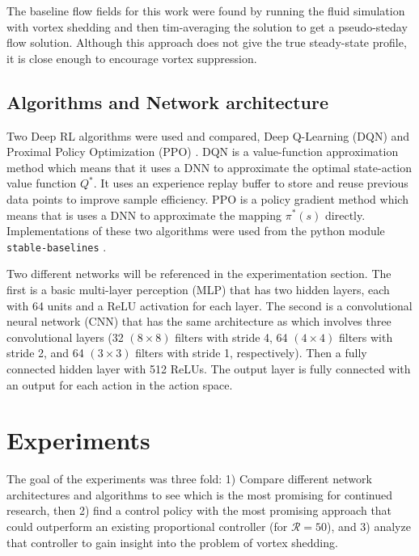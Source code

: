 \documentclass{article}
\begin{document}
The baseline flow fields for this work were found by running the fluid simulation with vortex shedding and then tim-averaging the solution to get a pseudo-steday flow solution. Although this approach does not give the true steady-state profile, it is close enough to encourage vortex suppression.

\subsection{Algorithms and Network architecture}

Two Deep RL algorithms were used and compared, Deep Q-Learning (DQN) \cite{mnih2013playing} and Proximal Policy Optimization (PPO) \cite{schulman2017proximal}.  DQN is a value-function approximation method which means that it uses a DNN to approximate the optimal state-action value function $Q^*$. It uses an experience replay buffer to store and reuse previous data points to improve sample efficiency. PPO is a policy gradient method which means that is uses a DNN to approximate the mapping $\pi^*(s)$ directly. Implementations of these two algorithms were used from the python module \verb|stable-baselines| \cite{stable-baselines}.


Two different networks will be referenced in the experimentation section. The first is a basic multi-layer perception (MLP) that has two hidden layers, each with 64 units and a ReLU activation for each layer. The second is a convolutional neural network (CNN) that has the same architecture as \cite{mnih2015human} which involves three convolutional layers (\num{32} $(8 \times 8)$ filters with stride \num{4},  \num{64} $(4 \times 4)$ filters with stride \num{2}, and \num{64} $(3 \times 3)$ filters with stride \num{1}, respectively). Then a fully connected hidden layer with 512 ReLUs. The output layer is fully connected with an output for each action in the action space. 

\section{Experiments}
\label{sec:experiments}

The goal of the experiments was three fold: 1) Compare different network architectures and algorithms to see which is the most promising for continued research, then 2) find a control policy with the most promising approach that could outperform an existing proportional controller (for $\mathcal{R} = 50$), and 3) analyze that controller to gain insight into the problem of vortex shedding. 
\end{document}
